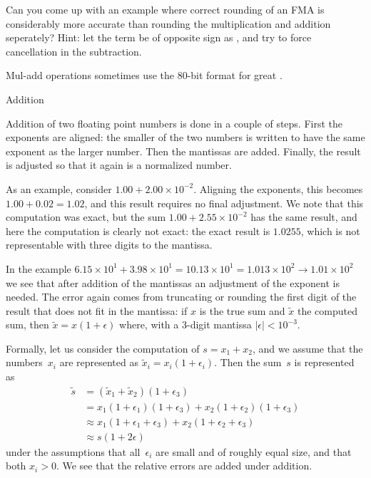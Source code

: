 \begin{exercise}
  Can you come up with an example where correct rounding of
  an \ac{FMA} is considerably more accurate than rounding the
  multiplication and addition seperately? Hint: let the  term be
  of opposite sign as , and try to force cancellation in the
  subtraction.
\end{exercise}

%
Mul-add operations sometimes use the 80-bit 
format for great .

 {Addition}

Addition of two floating point numbers is done in a couple of steps.
First the exponents are aligned: the smaller of the two numbers is
written to have the same exponent as the larger number. Then the
mantissas are added. Finally, the result is adjusted
so that it again is a normalized number.

As an example, consider $1.00+2.00\times 10^{-2}$. Aligning the
exponents, this becomes $1.00+0.02=1.02$, and this result requires no
final adjustment. We note that this computation was exact, but
the sum $1.00+2.55\times 10^{-2}$ has the same result, and here the
computation is clearly not exact: the exact result is $1.0255$, which
is not representable with three digits to the mantissa.

In the example $6.15\times 10^1+3.98\times 10^1=10.13\times 10^1=1.013\times
10^2\rightarrow 1.01\times 10^2$ we see that after addition of the mantissas an
adjustment of the exponent is needed. The error again comes from
truncating or rounding the first digit of the result that does not fit
in the mantissa: if $x$ is the true sum and $\tilde x$ the computed
sum, then $\tilde x=x(1+\epsilon)$ where, with a 3-digit mantissa
$|\epsilon|<10^{-3}$.

Formally, let us consider the computation of
$s=x_1+x_2$, and we assume that the numbers~$x_i$ are represented
as $\tilde x_i=x_i(1+\epsilon_i)$.
Then the sum~$s$ is represented as
\[ 
\begin{array}{rl}
\tilde s&=(\tilde x_1+\tilde x_2)(1+\epsilon_3)\\
&=x_1(1+\epsilon_1)(1+\epsilon_3)+x_2(1+\epsilon_2)(1+\epsilon_3)\\
&\approx x_1(1+\epsilon_1+\epsilon_3)+x_2(1+\epsilon_2+\epsilon_3)\\
&\approx s(1+2\epsilon)
\end{array}
\]
under the assumptions that all~$\epsilon_i$ are small and of roughly
equal size, and that both $x_i>0$.
We see that the relative errors are added under addition.

